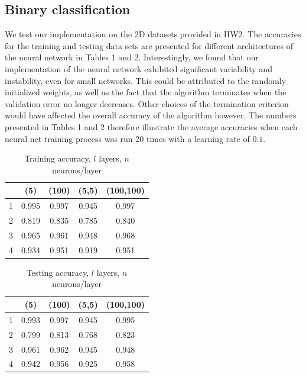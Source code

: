 \documentclass{article}
\begin{document}
\subsection{Binary classification}
We test our implementation on the 2D datasets provided in HW2. The accuracies for the training and testing data sets are presented for different architectures of the neural network in Tables 1 and 2. Interestingly, we found that our implementation of the neural network exhibited significant variability and instability, even for small networks. This could be attributed to the randomly initialized weights, as well as the fact that the algorithm terminates when the validation error no longer decreases. Other choices of the termination criterion would have affected the overall accuracy of the algorithm however. The numbers presented in Tables 1 and 2 therefore illustrate the average accuracies when each neural net training process was run 20 times with a learning rate of $0.1$.

\begin{table}
  \begin{center}
    \begin{tabular}{ | c | c | c | c | c | }
      \hline
          & (5) & (100) & (5,5) & (100,100) \\ \hline
      1   & 0.995      & 0.997        & 0.945      & 0.997        \\ \hline
      2   & 0.819      & 0.835        & 0.785      & 0.840        \\ \hline
      3   & 0.965      & 0.961        & 0.948      & 0.968        \\ \hline
      4   & 0.934      & 0.951        & 0.919      & 0.951        \\ \hline
    \end{tabular}
  \end{center}
  \caption{Training accuracy, $l$ layers, $n$ neurons/layer}
\end{table}

\begin{table}
  \begin{center}
    \begin{tabular}{ | c | c | c | c | c | }
      \hline
          & (5)   & (100) & (5,5) & (100,100) \\ \hline
      1   & 0.993      & 0.997        & 0.945      & 0.995        \\ \hline
      2   & 0.799      & 0.813        & 0.768      & 0.823        \\ \hline
      3   & 0.961      & 0.962        & 0.945      & 0.948        \\ \hline
      4   & 0.942      & 0.956        & 0.925      & 0.958        \\ \hline
    \end{tabular}
  \end{center}
  \caption{Testing accuracy, $l$ layers, $n$ neurons/layer}
\end{table}
\end{document}
